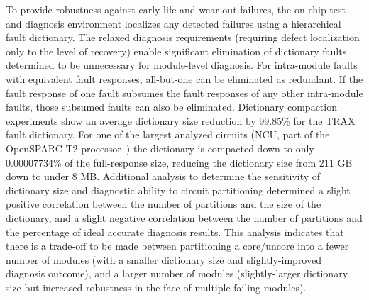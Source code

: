 To provide robustness against early-life and wear-out failures, the on-chip test and diagnosis environment localizes any detected failures using a hierarchical fault dictionary.
%
The relaxed diagnosis requirements (requiring defect localization only to the level of recovery) enable significant elimination of dictionary faults determined to be unnecessary for module-level diagnosis.
%
For intra-module faults with equivalent fault responses, all-but-one can be eliminated as redundant.
%
If the fault response of one fault subsumes the fault responses of any other intra-module faults, those subsumed faults can also be eliminated.
%
Dictionary compaction experiments show an average dictionary size reduction by 99.85\% for the TRAX fault dictionary.
%
For one of the largest analyzed circuits (NCU, part of the OpenSPARC T2 processor~\cite{sun11}) the dictionary is compacted down to only 0.00007734\% of the full-response size, reducing the dictionary size from 211 GB down to under 8 MB.
%
Additional analysis to determine the sensitivity of dictionary size and diagnostic ability to circuit partitioning determined a slight positive correlation between the number of partitions and the size of the dictionary, and a slight negative correlation between the number of partitions and the percentage of ideal accurate diagnosis results.
%
This analysis indicates that there is a trade-off to be made between partitioning a core/uncore into a fewer number of modules (with a smaller dictionary size and slightly-improved diagnosis outcome), and a larger number of modules (slightly-larger dictionary size but increased robustness in the face of multiple failing modules).
